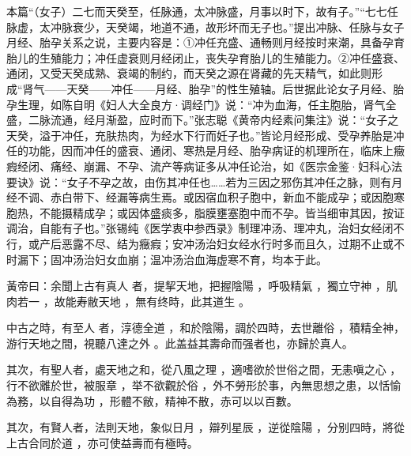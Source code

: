 \documentclass[draft,12pt]{ctexbook}
\begin{document}
本篇“（女子）二七而天癸至，任脉通，太冲脉盛，月事以时下，故有子。”“七七任脉虚，太冲脉衰少，天癸竭，地道不通，故形坏而无子也。”提出冲脉、任脉与女子月经、胎孕关系之说，主要内容是：①冲任充盛、通畅则月经按时来潮，具备孕育胎儿的生殖能力；冲任虚衰则月经闭止，丧失孕育胎儿的生殖能力。②冲任盛衰、通闭，又受天癸成熟、衰竭的制约，而天癸之源在肾藏的先天精气，如此则形成“肾气——天癸——冲任——月经、胎孕”的性生殖轴。后世据此论女子月经、胎孕生理，如陈自明《妇人大全良方·调经门》说：“冲为血海，任主胞胎，肾气全盛，二脉流通，经月渐盈，应时而下。”张志聪《黄帝内经素问集注》说：“女子之天癸，溢于冲任，充肤热肉，为经水下行而妊子也。”皆论月经形成、受孕养胎是冲任的功能，因而冲任的盛衰、通闭、寒热是月经、胎孕病证的机理所在，临床上癥瘕经闭、痛经、崩漏、不孕、流产等病证多从冲任论治，如《医宗金鉴·妇科心法要诀》说：“女子不孕之故，由伤其冲任也……若为三因之邪伤其冲任之脉，则有月经不调、赤白带下、经漏等病生焉。或因宿血积子胞中，新血不能成孕；或因胞寒胞热，不能摄精成孕；或因体盛痰多，脂膜壅塞胞中而不孕。皆当细审其因，按证调治，自能有子也。”张锡纯《医学衷中参西录》制理冲汤、理冲丸，治妇女经闭不行，或产后恶露不尽、结为癥瘕；安冲汤治妇女经水行时多而且久，过期不止或不时漏下；固冲汤治妇女血崩；温冲汤治血海虚寒不育，均本于此。


\begin{yuanwen}
黃帝曰：余聞上古有真人 者，提挈天地，把握陰陽 ，呼吸精氣 ，獨立守神 ，肌肉若一 ，故能寿敝天地 ，無有终時，此其道生 。

中古之時，有至人 者，淳德全道 ，和於陰陽，調於四時，去世離俗 ，積精全神，游行天地之間，視聽八達之外 。此盖益其壽命而强者也，亦歸於真人。

其次，有聖人者，處天地之和，從八風之理 ，適嗜欲於世俗之間，无恚嗔之心 ，行不欲離於世，被服章 ，举不欲觀於俗 ，外不勞形於事，內無思想之患，以恬愉為務，以自得為功 ，形體不敝，精神不散，赤可以以百數。

其次，有賢人者，法則天地，象似日月 ，辯列星辰 ，逆從陰陽 ，分别四時，將從上古合同於道 ，亦可使益壽而有極時。
\end{yuanwen}

\end{document}
